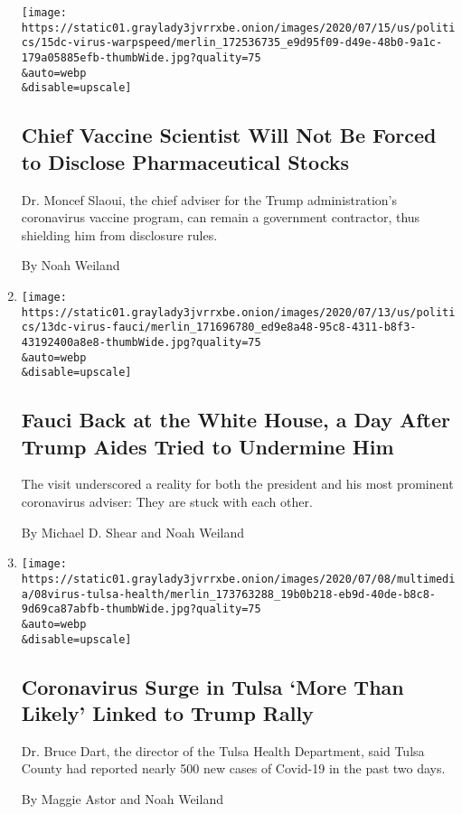 \begin{enumerate}
  \texttt{[image: https://static01.graylady3jvrrxbe.onion/images/2020/07/15/us/politics/15dc-virus-warpspeed/merlin\_172536735\_e9d95f09-d49e-48b0-9a1c-179a05885efb-thumbWide.jpg?quality=75\\\&auto=webp\\\&disable=upscale]}

  \hypertarget{chief-vaccine-scientist-will-not-be-forced-to-disclose-pharmaceutical-stocks}{%
  \subsection{Chief Vaccine Scientist Will Not Be Forced to Disclose
  Pharmaceutical
  Stocks}\label{chief-vaccine-scientist-will-not-be-forced-to-disclose-pharmaceutical-stocks}}

  Dr. Moncef Slaoui, the chief adviser for the Trump administration's
  coronavirus vaccine program, can remain a government contractor, thus
  shielding him from disclosure rules.

  By Noah Weiland
\item
  \href{/2020/07/13/us/politics/fauci-trump-coronavirus.html}{}

  \texttt{[image: https://static01.graylady3jvrrxbe.onion/images/2020/07/13/us/politics/13dc-virus-fauci/merlin\_171696780\_ed9e8a48-95c8-4311-b8f3-43192400a8e8-thumbWide.jpg?quality=75\\\&auto=webp\\\&disable=upscale]}

  \hypertarget{fauci-back-at-the-white-house-a-day-after-trump-aides-tried-to-undermine-him}{%
  \subsection{Fauci Back at the White House, a Day After Trump Aides
  Tried to Undermine
  Him}\label{fauci-back-at-the-white-house-a-day-after-trump-aides-tried-to-undermine-him}}

  The visit underscored a reality for both the president and his most
  prominent coronavirus adviser: They are stuck with each other.

  By Michael D. Shear and Noah Weiland
\item
  \href{/2020/07/08/us/politics/coronavirus-tulsa-trump-rally.html}{}

  \texttt{[image: https://static01.graylady3jvrrxbe.onion/images/2020/07/08/multimedia/08virus-tulsa-health/merlin\_173763288\_19b0b218-eb9d-40de-b8c8-9d69ca87abfb-thumbWide.jpg?quality=75\\\&auto=webp\\\&disable=upscale]}

  \hypertarget{coronavirus-surge-in-tulsa-more-than-likely-linked-to-trump-rally}{%
  \subsection{Coronavirus Surge in Tulsa `More Than Likely' Linked to
  Trump
  Rally}\label{coronavirus-surge-in-tulsa-more-than-likely-linked-to-trump-rally}}

  Dr. Bruce Dart, the director of the Tulsa Health Department, said
  Tulsa County had reported nearly 500 new cases of Covid-19 in the past
  two days.

  By Maggie Astor and Noah Weiland
\end{enumerate}

